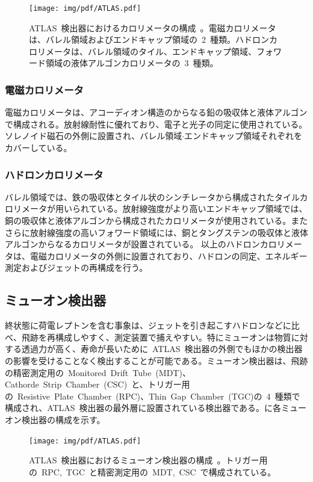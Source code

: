 \begin{figure}[H]
        \centering   
        \texttt{[image: img/pdf/ATLAS.pdf]}
        \caption[ATLAS~検出器におけるカロリメータの構成]{ATLAS~検出器におけるカロリメータの構成~\cite{TR:01}。電磁カロリメータは、バレル領域およびエンドキャップ領域の~2~種類。ハドロンカロリメータは、バレル領域のタイル、エンドキャップ領域、フォワード領域の液体アルゴンカロリメータの~3~種類。}\label{fig:calo}
\end{figure}

\subsubsection{電磁カロリメータ}
電磁カロリメータは、アコーディオン構造のからなる鉛の吸収体と液体アルゴンで構成される。放射線耐性に優れており、電子と光子の同定に使用されている。ソレノイド磁石の外側に設置され、バレル領域$\cdot$エンドキャップ領域それぞれをカバーしている。

\subsubsection{ハドロンカロリメータ}
バレル領域では、鉄の吸収体とタイル状のシンチレータから構成されたタイルカロリメータが用いられている。放射線強度がより高いエンドキャップ領域では、銅の吸収体と液体アルゴンから構成されたカロリメータが使用されている。またさらに放射線強度の高いフォワード領域には、銅とタングステンの吸収体と液体アルゴンからなるカロリメータが設置されている。
以上のハドロンカロリメータは、電磁カロリメータの外側に設置されており、ハドロンの同定、エネルギー測定およびジェットの再構成を行う。


\subsection{ミューオン検出器}
終状態に荷電レプトンを含む事象は、ジェットを引き起こすハドロンなどに比べ、飛跡を再構成しやすく、測定装置で捕えやすい。特にミューオンは物質に対する透過力が高く、寿命が長いために~ATLAS~検出器の外側でもほかの検出器の影響を受けることなく検出することが可能である。ミューオン検出器は、飛跡の精密測定用の~Monitored~Drift~Tube~(MDT)、Cathorde~Strip~Chamber~(CSC)~と、トリガー用の~Resistive~Plate~Chamber~(RPC)、Thin~Gap~Chamber~(TGC)の~4~種類で構成され、ATLAS~検出器の最外層に設置されている検出器である。に各ミューオン検出器の構成を示す。
\begin{figure}[tbp]
        \centering   
        \texttt{[image: img/pdf/ATLAS.pdf]}
        \caption[ATLAS~検出器におけるミューオン検出器の構成]{ATLAS~検出器におけるミューオン検出器の構成~\cite{TR:01}。トリガー用の~RPC,~TGC~と精密測定用の~MDT,~CSC~で構成されている。}\label{fig:mud}
\end{figure}

